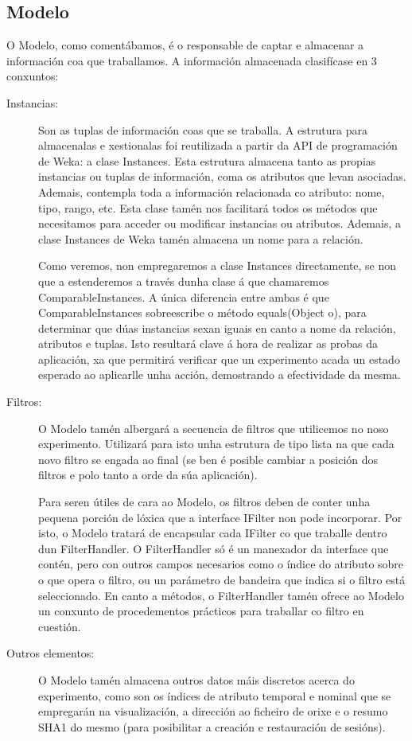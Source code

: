 \subsection{Modelo}

O Modelo, como comentábamos, é o responsable de captar e almacenar a información coa que traballamos. A información almacenada clasifícase en 3 conxuntos:

\begin{description}

\item[Instancias:]

Son as tuplas de información coas que se traballa. A estrutura para almacenalas e xestionalas foi reutilizada a partir da API de programación de Weka: a clase Instances. Esta estrutura almacena tanto as propias instancias ou tuplas de información, coma os atributos que levan asociadas. Ademais, contempla toda a información relacionada co atributo: nome, tipo, rango, etc. Esta clase tamén nos facilitará todos os métodos que necesitamos para acceder ou modificar instancias ou atributos. Ademais, a clase Instances de Weka tamén almacena un nome para a relación.

Como veremos, non empregaremos a clase Instances directamente, se non que a estenderemos a través dunha clase á que chamaremos ComparableInstances. A única diferencia entre ambas é que ComparableInstances sobreescribe o método equals(Object o), para determinar que dúas instancias sexan iguais en canto a nome da relación, atributos e tuplas. Isto resultará clave á hora de realizar as probas da aplicación, xa que permitirá verificar que un experimento acada un estado esperado ao aplicarlle unha acción, demostrando a efectividade da mesma.

\item[Filtros:]

O Modelo tamén albergará a secuencia de filtros que utilicemos no noso experimento. Utilizará para isto unha estrutura de tipo lista na que cada novo filtro se engada ao final (se ben é posible cambiar a posición dos filtros e polo tanto a orde da súa aplicación).

Para seren útiles de cara ao Modelo, os filtros deben de conter unha pequena porción de lóxica que a interface IFilter non pode incorporar. Por isto, o Modelo tratará de encapsular cada IFilter co que traballe dentro dun FilterHandler. O FilterHandler só é un manexador da interface que contén, pero con outros campos necesarios como o índice do atributo sobre o que opera o filtro, ou un parámetro de bandeira que indica si o filtro está seleccionado. En canto a métodos, o FilterHandler tamén ofrece ao Modelo un conxunto de procedementos prácticos para traballar co filtro en cuestión.

\item[Outros elementos:]

O Modelo tamén almacena outros datos máis discretos acerca do experimento, como son os índices de atributo temporal e nominal que se empregarán na visualización, a dirección ao ficheiro de orixe e o resumo SHA1 do mesmo (para posibilitar a creación e restauración de sesións).

\end{description}

